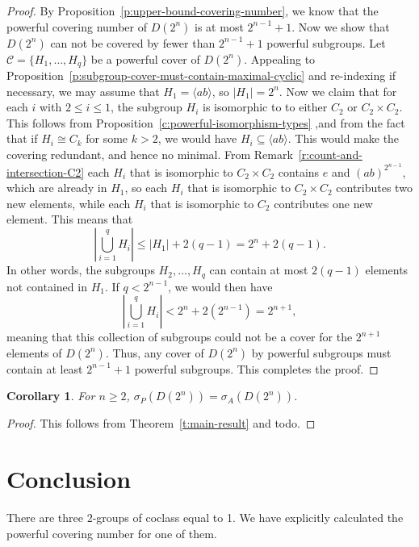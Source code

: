 \documentclass{amsart}
\numberwithin{equation} {section}
\newtheorem{corollary}[equation]{Corollary}
\theoremstyle{definition}
\begin{document}
\begin{proof}
By Proposition~\ref{p:upper-bound-covering-number}, we know that the powerful covering number of $D(2^n)$ is at most $2^{n-1} + 1$. Now we show that $D(2^n)$ can not be covered by fewer than $2^{n-1} + 1$ powerful subgroups. Let $\mathcal{C} = \{ H_1, \ldots, H_q \}$ be a powerful cover of $D(2^n)$. Appealing to Proposition~\ref{p:subgroup-cover-must-contain-maximal-cyclic} and re-indexing if necessary, we may assume that $H_1 = \langle ab \rangle$, so $|H_1| = 2^n$. Now we claim that for each $i$ with $2 \leq i \leq 1$, the subgroup $H_i$ is isomorphic to to either $C_2$ or $C_2 \times C_2$.  This follows from Proposition~\ref{c:powerful-isomorphism-types} ,and from the fact that if $H_i \cong C_k$ for some $k > 2$, we would have $H_i \subseteq \langle ab \rangle$. This would make the covering redundant, and hence no minimal. 
From Remark~\ref{r:count-and-intersection-C2} each $H_i$ that is isomorphic to $C_2 \times C_2$ contains $e$ and $(ab)^{2^{n-1}}$, which are already in $H_1$, so each $H_i$ that is isomorphic to $C_2 \times C_2$ contributes two new elements, while each $H_i$ that is isomorphic to $C_2$ contributes one new element.  This means that
\[
\left| \bigcup_{i=1}^q H_i \right| \leq |H_1| + 2(q -1) = 2^{n} + 2(q-1).
\]
In other words, the subgroups $H_2, \ldots, H_q$ can contain at most $2(q-1)$ elements not contained in $H_1$.
If $q < 2^{n-1}$, we would then have \[
\left| \bigcup_{i=1}^q H_i \right| < 2^{n} + 2(2^{n-1}) = 2^{n+1},
\] meaning that this collection of subgroups could not be a cover for the $2^{n+1}$ elements of $D(2^n)$. Thus, any cover of $D(2^n)$ by powerful subgroups must contain at least $2^{n-1} + 1$ powerful subgroups. This completes the proof. 
\end{proof} 

\begin{corollary}
For $n \geq 2$, $\sigma_P(D(2^n)) = \sigma_A(D(2^n))$.
\end{corollary}

\begin{proof}
This follows from Theorem~\ref{t:main-result} and todo.
\end{proof}

\section{Conclusion}

There are three $2$-groups of coclass equal to 1. We have explicitly calculated the powerful covering number for one of them. 
\end{document}
